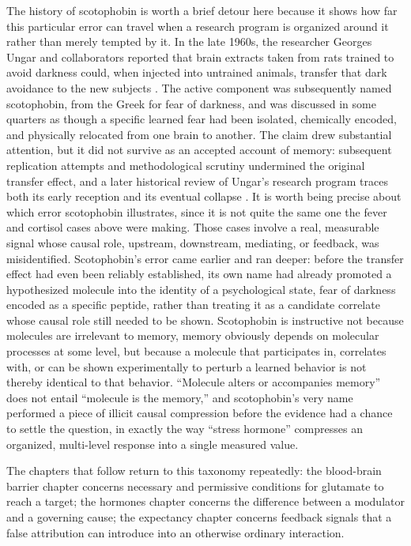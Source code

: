 \documentclass[11pt]{article}
\begin{document}
The history of scotophobin is worth a brief detour here because it shows how far this particular error can travel when a research program is organized around it rather than merely tempted by it. In the late 1960s, the researcher Georges Ungar and collaborators reported that brain extracts taken from rats trained to avoid darkness could, when injected into untrained animals, transfer that dark avoidance to the new subjects \citep{ungar1968chemical}. The active component was subsequently named scotophobin, from the Greek for fear of darkness, and was discussed in some quarters as though a specific learned fear had been isolated, chemically encoded, and physically relocated from one brain to another. The claim drew substantial attention, but it did not survive as an accepted account of memory: subsequent replication attempts and methodological scrutiny undermined the original transfer effect, and a later historical review of Ungar's research program traces both its early reception and its eventual collapse \citep{setlow1997ungar}. It is worth being precise about which error scotophobin illustrates, since it is not quite the same one the fever and cortisol cases above were making. Those cases involve a real, measurable signal whose causal role, upstream, downstream, mediating, or feedback, was misidentified. Scotophobin's error came earlier and ran deeper: before the transfer effect had even been reliably established, its own name had already promoted a hypothesized molecule into the identity of a psychological state, fear of darkness encoded as a specific peptide, rather than treating it as a candidate correlate whose causal role still needed to be shown. Scotophobin is instructive not because molecules are irrelevant to memory, memory obviously depends on molecular processes at some level, but because a molecule that participates in, correlates with, or can be shown experimentally to perturb a learned behavior is not thereby identical to that behavior. ``Molecule alters or accompanies memory'' does not entail ``molecule is the memory,'' and scotophobin's very name performed a piece of illicit causal compression before the evidence had a chance to settle the question, in exactly the way ``stress hormone'' compresses an organized, multi-level response into a single measured value.

The chapters that follow return to this taxonomy repeatedly: the blood-brain barrier chapter concerns necessary and permissive conditions for glutamate to reach a target; the hormones chapter concerns the difference between a modulator and a governing cause; the expectancy chapter concerns feedback signals that a false attribution can introduce into an otherwise ordinary interaction.
\end{document}

